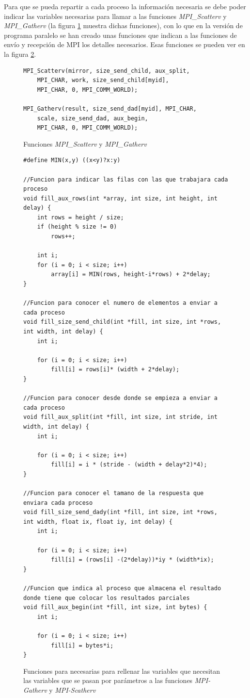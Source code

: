 \documentclass{article}
\begin{document}
Para que se pueda repartir a cada proceso la información necesaria se debe poder indicar las variables necesarias para llamar a las funciones \emph{MPI\_Scatterv} y \emph{MPI\_Gatherv} (la figura \ref{fig:scatterGather} muestra dichas funciones), con lo que en la versión de programa paralelo se han creado unas funciones que indican a las funciones de envío y recepción de MPI los detalles necesarios. Esas funciones se pueden ver en la figura \ref{cod:fill_to_MPI}.

\begin{figure}[h]
\begin{lstlisting}[style=C]
MPI_Scatterv(mirror, size_send_child, aux_split,
	MPI_CHAR, work, size_send_child[myid],
	MPI_CHAR, 0, MPI_COMM_WORLD);
			
MPI_Gatherv(result, size_send_dad[myid], MPI_CHAR,
	scale, size_send_dad, aux_begin,
	MPI_CHAR, 0, MPI_COMM_WORLD);
\end{lstlisting}
\caption{Funciones \emph{MPI\_Scatterv} y \emph{MPI\_Gatherv}}
\label{fig:scatterGather}
\end{figure}

\begin{figure}[h]
\begin{lstlisting}[style=C]
#define MIN(x,y) ((x<y)?x:y)

//Funcion para indicar las filas con las que trabajara cada proceso
void fill_aux_rows(int *array, int size, int height, int delay) {
	int rows = height / size;	
	if (height % size != 0)
		rows++;
	
	int i;
	for (i = 0; i < size; i++)
		array[i] = MIN(rows, height-i*rows) + 2*delay;
}

//Funcion para conocer el numero de elementos a enviar a cada proceso
void fill_size_send_child(int *fill, int size, int *rows, int width, int delay) {
	int i;
	
	for (i = 0; i < size; i++)
		fill[i] = rows[i]* (width + 2*delay);
}

//Funcion para conocer desde donde se empieza a enviar a cada proceso
void fill_aux_split(int *fill, int size, int stride, int width, int delay) {
	int i;
	
	for (i = 0; i < size; i++) 
		fill[i] = i * (stride - (width + delay*2)*4);
}

//Funcion para conocer el tamano de la respuesta que enviara cada proceso
void fill_size_send_dady(int *fill, int size, int *rows, int width, float ix, float iy, int delay) {
	int i;
	
	for (i = 0; i < size; i++)
		fill[i] = (rows[i] -(2*delay))*iy * (width*ix);
}

//Funcion que indica al proceso que almacena el resultado donde tiene que colocar los resultados parciales
void fill_aux_begin(int *fill, int size, int bytes) {
	int i;
	
	for (i = 0; i < size; i++)
		fill[i] = bytes*i;
}
\end{lstlisting}
\caption{Funciones para necesarias para rellenar las variables que necesitan las variables que se pasan por parámetros a las funciones \emph{MPI-Gatherv} y \emph{MPI-Scatherv}}
\label{cod:fill_to_MPI}
\end{figure}
\end{document}
